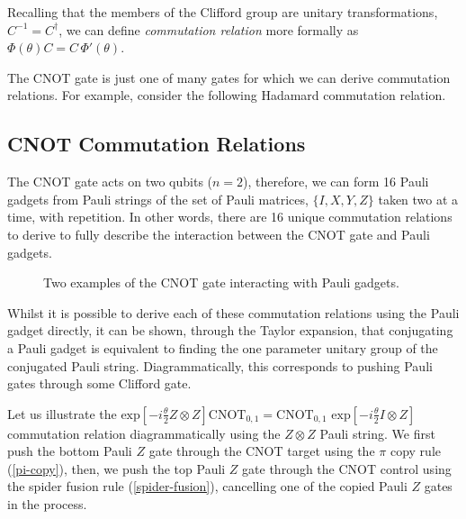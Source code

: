 
Recalling that the members of the Clifford group are unitary transformations, $C^{-1} = C^\dagger$, we can define \textit{commutation relation} more formally as $\Phi(\theta) C = C \, \Phi'(\theta)$.


The CNOT gate is just one of many gates for which we can derive commutation relations. For example, consider the following Hadamard commutation relation.



\subsection{CNOT Commutation Relations}

The CNOT gate acts on two qubits ($n = 2$), therefore, we can form 16 Pauli gadgets from Pauli strings of the set of Pauli matrices, $\{I, X, Y, Z\}$ taken two at a time, with repetition. In other words, there are 16 unique commutation relations to derive to fully describe the interaction between the CNOT gate and Pauli gadgets.

\begin{figure}[H]
    \centering
    \caption{Two examples of the CNOT gate interacting with Pauli gadgets.}
\end{figure}

Whilst it is possible to derive each of these commutation relations using the Pauli gadget directly, it can be shown, through the Taylor expansion, that conjugating a Pauli gadget is equivalent to finding the one parameter unitary group of the conjugated Pauli string. Diagrammatically, this corresponds to pushing Pauli gates through some Clifford gate.

Let us illustrate the $\text{exp} \left[ - i\frac{\theta}{2} Z \otimes Z \right] \text{CNOT}_{0, 1} = \text{CNOT}_{0, 1} \,\, \text{exp} \left[ - i\frac{\theta}{2} I \otimes Z \right]$ commutation relation diagrammatically using the $Z \otimes Z$ Pauli string. We first push the bottom Pauli $Z$ gate through the CNOT target using the $\pi$ copy rule (\ref{pi-copy}), then, we push the top Pauli $Z$ gate through the CNOT control using the spider fusion rule (\ref{spider-fusion}), cancelling one of the copied Pauli $Z$ gates in the process.


